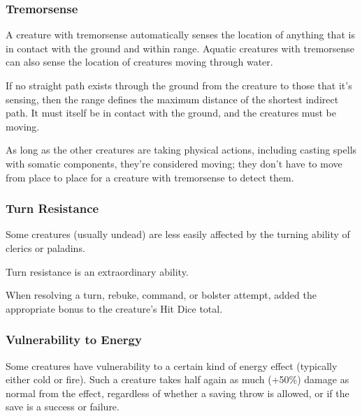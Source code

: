 \subsubsection{Tremorsense}
A creature with tremorsense automatically senses the location of anything that is in contact with the ground and within range. Aquatic creatures with tremorsense can also sense the location of creatures moving through water.

If no straight path exists through the ground from the creature to those that it's sensing, then the range defines the maximum distance of the shortest indirect path. It must itself be in contact with the ground, and the creatures must be moving.

As long as the other creatures are taking physical actions, including casting spells with somatic components, they're considered moving; they don't have to move from place to place for a creature with tremorsense to detect them.

\subsubsection{Turn Resistance}
Some creatures (usually undead) are less easily affected by the turning ability of clerics or paladins.

Turn resistance is an extraordinary ability.

When resolving a turn, rebuke, command, or bolster attempt, added the appropriate bonus to the creature's Hit Dice total.

\subsubsection{Vulnerability to Energy}
Some creatures have vulnerability to a certain kind of energy effect (typically either cold or fire). Such a creature takes half again as much (+50\%) damage as normal from the effect, regardless of whether a saving throw is allowed, or if the save is a success or failure.


